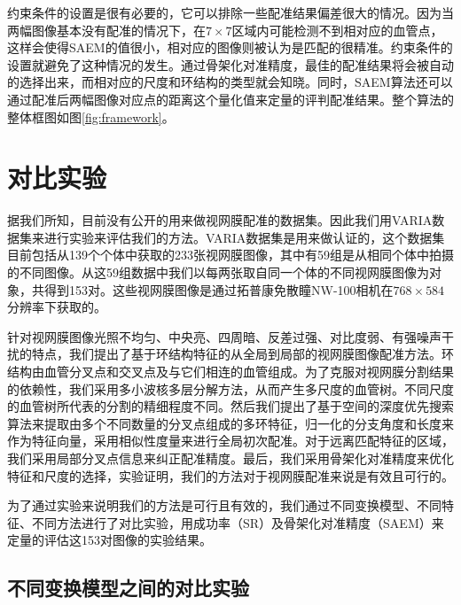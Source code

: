 约束条件的设置是很有必要的，它可以排除一些配准结果偏差很大的情况。因为当两幅图像基本没有配准的情况下，在$7 \times 7$区域内可能检测不到相对应的血管点，这样会使得SAEM的值很小，相对应的图像则被认为是匹配的很精准。约束条件的设置就避免了这种情况的发生。通过骨架化对准精度，最佳的配准结果将会被自动的选择出来，而相对应的尺度和环结构的类型就会知晓。同时，SAEM算法还可以通过配准后两幅图像对应点的距离这个量化值来定量的评判配准结果。整个算法的整体框图如图\ref{fig:framework}。
\section{对比实验}
\label{}
据我们所知，目前没有公开的用来做视网膜配准的数据集。因此我们用VARIA数据集\cite{ortega2009retinal,ortega2009personal}来进行实验来评估我们的方法。VARIA数据集是用来做认证的，这个数据集目前包括从139个个体中获取的233张视网膜图像，其中有59组是从相同个体中拍摄的不同图像。从这59组数据中我们以每两张取自同一个体的不同视网膜图像为对象，共得到153对。这些视网膜图像是通过拓普康免散瞳NW-100相机在$768 \times 584$分辨率下获取的。

针对视网膜图像光照不均匀、中央亮、四周暗、反差过强、对比度弱、有强噪声干扰的特点，我们提出了基于环结构特征的从全局到局部的视网膜图像配准方法。环结构由血管分叉点和交叉点及与它们相连的血管组成。为了克服对视网膜分割结果的依赖性，我们采用多小波核多层分解方法，从而产生多尺度的血管树。不同尺度的血管树所代表的分割的精细程度不同。然后我们提出了基于空间的深度优先搜索算法来提取由多个不同数量的分叉点组成的多环特征，归一化的分支角度和长度来作为特征向量，采用相似性度量来进行全局初次配准。对于远离匹配特征的区域，我们采用局部分叉点信息来纠正配准精度。最后，我们采用骨架化对准精度来优化特征和尺度的选择，实验证明，我们的方法对于视网膜配准来说是有效且可行的。

为了通过实验来说明我们的方法是可行且有效的，我们通过不同变换模型、不同特征、不同方法进行了对比实验，用成功率（SR）及骨架化对准精度（SAEM）来定量的评估这153对图像的实验结果。

\subsection{不同变换模型之间的对比实验}

